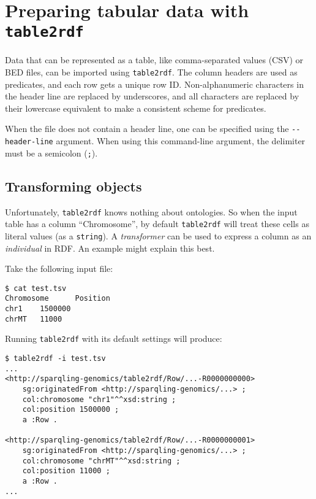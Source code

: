 \section{Preparing tabular data with \texttt{table2rdf}}
\label{sec:table2rdf}

  Data that can be represented as a table, like comma-separated values (CSV)
  or BED files, can be imported using \texttt{table2rdf}.  The column headers
  are used as predicates, and each row gets a unique row ID.  Non-alphanumeric
  characters in the header line are replaced by underscores, and all characters
  are replaced by their lowercase equivalent to make a consistent scheme for
  predicates.

  When the file does not contain a header line, one can be specified using the
  \texttt{-{}-header-line} argument.  When using this command-line argument, the
  delimiter must be a semicolon (\texttt{;}).

\subsection{Transforming objects}

  Unfortunately, \texttt{table2rdf} knows nothing about ontologies.  So when
  the input table has a column ``Chromosome'', by default \texttt{table2rdf}
  will treat these cells as literal values (as a \texttt{string}).  A
  \emph{transformer} can be used to express a column as an \emph{individual} in
  RDF.  An example might explain this best.

  Take the following input file:
\begin{siderules}
\begin{verbatim}
$ cat test.tsv
Chromosome      Position
chr1    1500000
chrMT   11000
\end{verbatim}
\end{siderules}

  Running \texttt{table2rdf} with its default settings will produce:

\begin{siderules}
\begin{verbatim}
$ table2rdf -i test.tsv
...
<http://sparqling-genomics/table2rdf/Row/...-R0000000000>
    sg:originatedFrom <http://sparqling-genomics/...> ;
    col:chromosome "chr1"^^xsd:string ;
    col:position 1500000 ;
    a :Row .

<http://sparqling-genomics/table2rdf/Row/...-R0000000001>
    sg:originatedFrom <http://sparqling-genomics/...> ;
    col:chromosome "chrMT"^^xsd:string ;
    col:position 11000 ;
    a :Row .
...
\end{verbatim}
\end{siderules}

